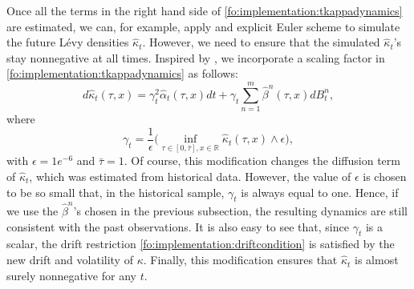 \documentclass{article}
\numberwithin{equation}{section}
\newcommand\RR {\mathbb R}
\def\halpha{\hat{\alpha}}
\def\hbeta{\hat{\beta}}
\def\hkappa{\hat{\kappa}}
\begin{document}
Once all the terms in the right hand side of \eqref{fo:implementation:tkappadynamics} are estimated, we can, for example, apply and explicit Euler scheme to simulate the future L\'evy densities $\hkappa_t$. However, we need to ensure that the simulated $\hkappa_t$'s stay nonnegative at all times. Inspired by \cite{carmona2010tangentlevy}, we incorporate a scaling factor in \eqref{fo:implementation:tkappadynamics} as follows:
\begin{equation}\label{fo:implementation:tkappadynamics_mod} 
d\hkappa_t(\tau,x) = \gamma_t^2 \halpha_t(\tau,x) dt +  \gamma_t \sum_{n=1}^m \hbeta^n(\tau,x) dB_t^n,
\end{equation}   
where 
\begin{equation}\label{fo:implementation:gammat}
\gamma_t = \frac{1}{\epsilon} \bigg(\inf_{ \tau \in [0, \bar{\tau}], x\in \RR} \hkappa_t(\tau,x) \land \epsilon\bigg),
\end{equation}
with $\epsilon = 1e^{-6}$ and $\bar{\tau}=1$. Of course, this modification changes the diffusion term of $\hkappa_t$, which was estimated from historical data. However, the value of $\epsilon$ is chosen to be so small that, in the historical sample, $\gamma_t$ is always equal to one. Hence, if we use the $\hbeta^n$'s chosen in the previous subsection, the resulting dynamics are still consistent with the past observations. It is also easy to see that, since $\gamma_t$ is a scalar, the drift restriction \eqref{fo:implementation:driftcondition} is satisfied by the new drift and volatility of $\kappa$. Finally, this modification ensures that $\hkappa_t$ is almost surely nonnegative for any $t$. 
\end{document}
